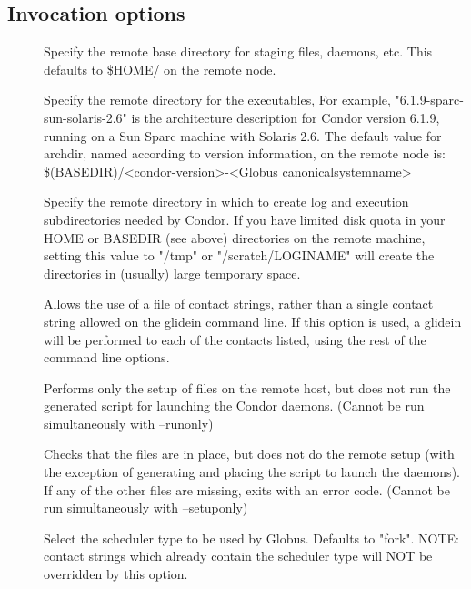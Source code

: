 \subsection{Invocation options}
\begin{description}
\item[]
	Specify the remote base directory for staging files, daemons, etc. 
	This defaults to \$HOME/ on the remote node.

\item[]
	Specify the remote directory for the executables, 
	For example, "6.1.9-sparc-sun-solaris-2.6" is the architecture description 
	for Condor version 6.1.9, running on a Sun Sparc machine with Solaris 2.6. 
	The default value for archdir, named according to version information, on 
	the remote node is:
	\$(BASEDIR)/<condor-version>-<Globus canonicalsystemname>

\item[]
	Specify the remote directory in which to create log and execution 
	subdirectories needed by Condor. If you have limited disk quota in
	your HOME or BASEDIR (see above) directories on the remote machine,
	setting this value to "/tmp" or "/scratch/LOGINAME" will create the
	directories in (usually) large temporary space.

\item[]
	Allows the use of a file of contact strings, rather than a single
	contact string allowed on the glidein command line. If this option
	is used, a glidein will be performed to each of the contacts listed,
	using the rest of the command line options.

\item[]
   Performs only the setup of files on the remote host, but does not
   run the generated script for launching the Condor daemons.
   (Cannot be run simultaneously with --runonly)

\item[]
   Checks that the files are in place, but does not do the remote setup
   (with the exception of generating and placing the script to launch
   the daemons). If any of the other files are missing, exits with
   an error code.
   (Cannot be run simultaneously with --setuponly)

\item[]
	Select the scheduler type to be used by Globus. Defaults to "fork".
	NOTE: contact strings which already contain the scheduler type will NOT
	be overridden by this option.


\end{description}
